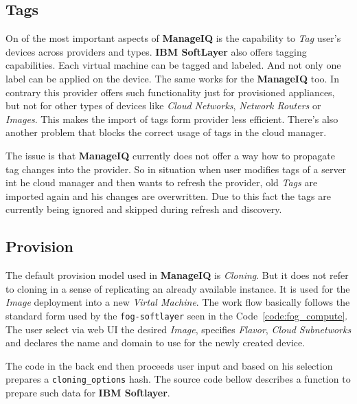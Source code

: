 \subsection{Tags}
\label{sub:Tags}

On of the most important aspects of \textbf{ManageIQ} is the capability to \emph{Tag} user's devices across providers and types. \textbf{IBM SoftLayer} also offers tagging capabilities. Each virtual machine can be tagged and labeled. And not only one label can be applied on the device. The same works for the \textbf{ManageIQ} too. In contrary this provider offers such functionality just for provisioned appliances, but not for other types of devices like \emph{Cloud Networks}, \emph{Network Routers} or \emph{Images}. This makes the import of tags form provider less efficient. There's also another problem that blocks the correct usage of tags in the cloud manager.

The issue is that \textbf{ManageIQ} currently does not offer a way how to propagate tag changes into the provider. So in situation when user modifies tags of a server int he cloud manager and then wants to refresh the provider, old \emph{Tags} are imported again and his changes are overwritten. Due to this fact the tags are currently being ignored and skipped during refresh and discovery.

\clearpage
\subsection{Provision}
\label{sub:Provision}

The default provision model used in \textbf{ManageIQ} is \emph{Cloning}. But it does not refer to cloning in a sense of replicating an already available instance. It is used for the \emph{Image} deployment into a new \emph{Virtal Machine}.
The work flow basically follows the standard form used by the \texttt{fog-softlayer} seen in the Code~\ref{code:fog_compute}. The user select via web UI the desired \emph{Image}, specifies \emph{Flavor}, \emph{Cloud Subnetworks} and declares the name and domain to use for the newly created device.

The code in the back end then proceeds user input and based on his selection prepares a \texttt{cloning\_options} hash. The source code bellow describes a function to prepare such data for \textbf{IBM Softlayer}.

